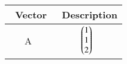 \begin{tabular}[12pt]{ |c| c|}
    \hline
    \ Vector & \ Description\\ 
    \hline
	A & $\begin{pmatrix}1\\1\\2\end{pmatrix}$ \\
   \hline
    \end{tabular}
